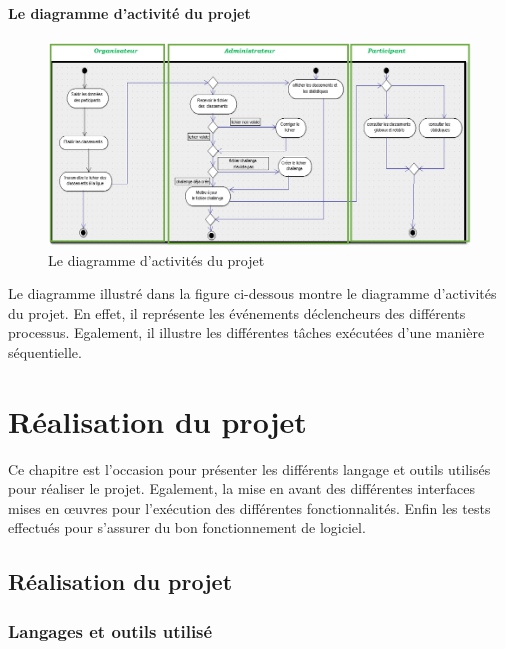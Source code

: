 \documentclass[12pt,a4paper]{report}
\begin{document}
\subsubsection{Le diagramme d'activité du projet}
\begin{figure}
	   \center
	   \includegraphics[scale=0.5]{Diagramme_activites.png}
	   \caption {Le diagramme d’activités du projet}
\end{figure}

Le diagramme illustré dans la figure ci-dessous montre le diagramme d’activités du projet. En effet, il représente les événements déclencheurs des différents processus. Egalement, il illustre les différentes tâches exécutées d’une manière séquentielle. 
\newpage
\chapter{Réalisation du projet}
Ce chapitre est l’occasion pour présenter les différents langage et outils utilisés pour réaliser le projet. Egalement, la mise en avant des différentes interfaces mises en œuvres pour l’exécution des différentes fonctionnalités. Enfin les tests effectués pour s’assurer du bon fonctionnement de logiciel.

\newpage
\section {Réalisation du projet }
\subsection {Langages et outils utilisé  }
\end{document}
